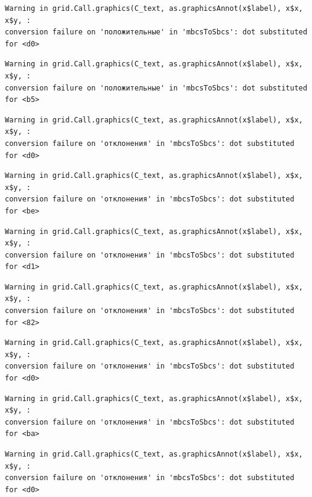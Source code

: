 \documentclass[
  letterpaper,
]{scrbook}
\theoremstyle{definition}
\theoremstyle{remark}
\begin{document}
\begin{verbatim}
Warning in grid.Call.graphics(C_text, as.graphicsAnnot(x$label), x$x, x$y, :
conversion failure on 'положительные' in 'mbcsToSbcs': dot substituted for <d0>
\end{verbatim}

\begin{verbatim}
Warning in grid.Call.graphics(C_text, as.graphicsAnnot(x$label), x$x, x$y, :
conversion failure on 'положительные' in 'mbcsToSbcs': dot substituted for <b5>
\end{verbatim}

\begin{verbatim}
Warning in grid.Call.graphics(C_text, as.graphicsAnnot(x$label), x$x, x$y, :
conversion failure on 'отклонения' in 'mbcsToSbcs': dot substituted for <d0>
\end{verbatim}

\begin{verbatim}
Warning in grid.Call.graphics(C_text, as.graphicsAnnot(x$label), x$x, x$y, :
conversion failure on 'отклонения' in 'mbcsToSbcs': dot substituted for <be>
\end{verbatim}

\begin{verbatim}
Warning in grid.Call.graphics(C_text, as.graphicsAnnot(x$label), x$x, x$y, :
conversion failure on 'отклонения' in 'mbcsToSbcs': dot substituted for <d1>
\end{verbatim}

\begin{verbatim}
Warning in grid.Call.graphics(C_text, as.graphicsAnnot(x$label), x$x, x$y, :
conversion failure on 'отклонения' in 'mbcsToSbcs': dot substituted for <82>
\end{verbatim}

\begin{verbatim}
Warning in grid.Call.graphics(C_text, as.graphicsAnnot(x$label), x$x, x$y, :
conversion failure on 'отклонения' in 'mbcsToSbcs': dot substituted for <d0>
\end{verbatim}

\begin{verbatim}
Warning in grid.Call.graphics(C_text, as.graphicsAnnot(x$label), x$x, x$y, :
conversion failure on 'отклонения' in 'mbcsToSbcs': dot substituted for <ba>
\end{verbatim}

\begin{verbatim}
Warning in grid.Call.graphics(C_text, as.graphicsAnnot(x$label), x$x, x$y, :
conversion failure on 'отклонения' in 'mbcsToSbcs': dot substituted for <d0>
\end{verbatim}
\end{document}
